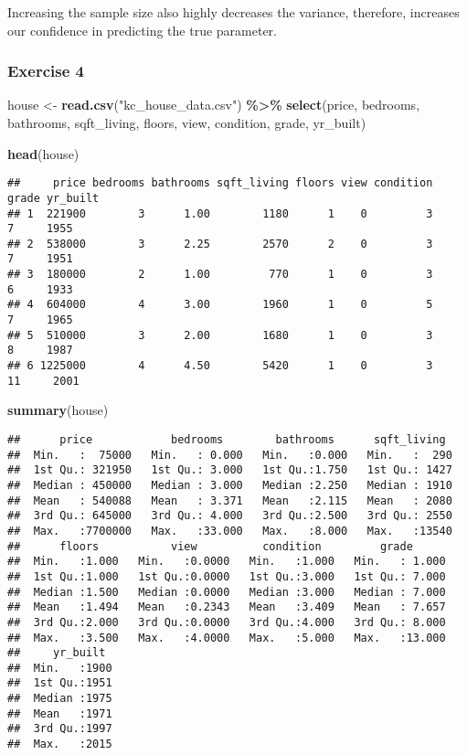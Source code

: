 \documentclass[
]{article}
\newenvironment{Shaded}{\begin{snugshade}}{\end{snugshade}}
\newcommand{\FunctionTok}[1]{\textcolor[rgb]{0.13,0.29,0.53}{\textbf{#1}}}
\newcommand{\NormalTok}[1]{#1}
\newcommand{\OtherTok}[1]{\textcolor[rgb]{0.56,0.35,0.01}{#1}}
\newcommand{\SpecialCharTok}[1]{\textcolor[rgb]{0.81,0.36,0.00}{\textbf{#1}}}
\newcommand{\StringTok}[1]{\textcolor[rgb]{0.31,0.60,0.02}{#1}}
\begin{document}
Increasing the sample size also highly decreases the variance,
therefore, increases our confidence in predicting the true parameter.

\subsubsection{Exercise 4}\label{exercise-4}

\begin{Shaded}
\begin{Highlighting}[]
\NormalTok{house }\OtherTok{\textless{}{-}} \FunctionTok{read.csv}\NormalTok{(}\StringTok{"kc\_house\_data.csv"}\NormalTok{) }\SpecialCharTok{\%\textgreater{}\%}
  \FunctionTok{select}\NormalTok{(price, bedrooms, bathrooms,}
\NormalTok{  sqft\_living, floors, view,}
\NormalTok{  condition, grade, yr\_built)}

\FunctionTok{head}\NormalTok{(house)}
\end{Highlighting}
\end{Shaded}

\begin{verbatim}
##     price bedrooms bathrooms sqft_living floors view condition grade yr_built
## 1  221900        3      1.00        1180      1    0         3     7     1955
## 2  538000        3      2.25        2570      2    0         3     7     1951
## 3  180000        2      1.00         770      1    0         3     6     1933
## 4  604000        4      3.00        1960      1    0         5     7     1965
## 5  510000        3      2.00        1680      1    0         3     8     1987
## 6 1225000        4      4.50        5420      1    0         3    11     2001
\end{verbatim}

\begin{Shaded}
\begin{Highlighting}[]
\FunctionTok{summary}\NormalTok{(house)}
\end{Highlighting}
\end{Shaded}

\begin{verbatim}
##      price            bedrooms        bathrooms      sqft_living   
##  Min.   :  75000   Min.   : 0.000   Min.   :0.000   Min.   :  290  
##  1st Qu.: 321950   1st Qu.: 3.000   1st Qu.:1.750   1st Qu.: 1427  
##  Median : 450000   Median : 3.000   Median :2.250   Median : 1910  
##  Mean   : 540088   Mean   : 3.371   Mean   :2.115   Mean   : 2080  
##  3rd Qu.: 645000   3rd Qu.: 4.000   3rd Qu.:2.500   3rd Qu.: 2550  
##  Max.   :7700000   Max.   :33.000   Max.   :8.000   Max.   :13540  
##      floors           view          condition         grade       
##  Min.   :1.000   Min.   :0.0000   Min.   :1.000   Min.   : 1.000  
##  1st Qu.:1.000   1st Qu.:0.0000   1st Qu.:3.000   1st Qu.: 7.000  
##  Median :1.500   Median :0.0000   Median :3.000   Median : 7.000  
##  Mean   :1.494   Mean   :0.2343   Mean   :3.409   Mean   : 7.657  
##  3rd Qu.:2.000   3rd Qu.:0.0000   3rd Qu.:4.000   3rd Qu.: 8.000  
##  Max.   :3.500   Max.   :4.0000   Max.   :5.000   Max.   :13.000  
##     yr_built   
##  Min.   :1900  
##  1st Qu.:1951  
##  Median :1975  
##  Mean   :1971  
##  3rd Qu.:1997  
##  Max.   :2015
\end{verbatim}
\end{document}
